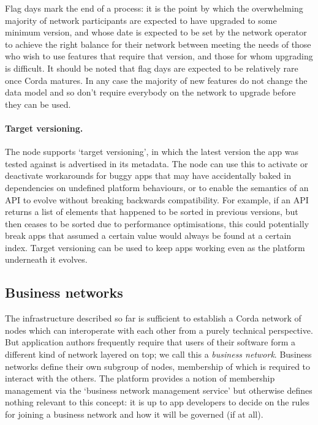 \documentclass{article}
\begin{document}
Flag days mark the end of a process: it is the point by which the overwhelming majority of network participants are
expected to have upgraded to some minimum version, and whose date is expected to be set by the network operator to
achieve the right balance for their network between meeting the needs of those who wish to use features that
require that version, and those for whom upgrading is difficult. It should be noted that flag days are expected to
be relatively rare once Corda matures. In any case the majority of new features do not change the data model and so
don't require everybody on the network to upgrade before they can be used.

\paragraph{Target versioning.}The node supports `target versioning', in which the latest version the app was
tested against is advertised in its metadata. The node can use this to activate or deactivate workarounds for buggy
apps that may have accidentally baked in dependencies on undefined platform behaviours, or to enable the semantics
of an API to evolve without breaking backwards compatibility. For example, if an API returns a list of elements
that happened to be sorted in previous versions, but then ceases to be sorted due to performance optimisations,
this could potentially break apps that assumed a certain value would always be found at a certain index. Target
versioning can be used to keep apps working even as the platform underneath it evolves.

\subsection{Business networks}

The infrastructure described so far is sufficient to establish a Corda network of nodes which can interoperate
with each other from a purely technical perspective. But application authors frequently require that users
of their software form a different kind of network layered on top; we call this a \emph{business network}.
Business networks define their own subgroup of nodes, membership of which is required to interact with the
others. The platform provides a notion of membership management via the `business network management service'
but otherwise defines nothing relevant to this concept: it is up to app developers to decide on the rules for
joining a business network and how it will be governed (if at all).
\end{document}
